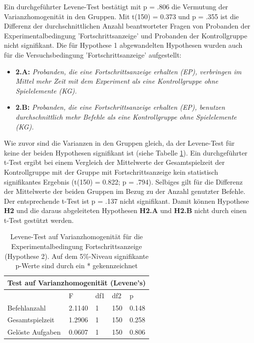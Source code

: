 Ein durchgeführter Levene-Test bestätigt mit p = .806 die Vermutung der Varianzhomogenität in den Gruppen. Mit t(150) = 0.373 und p = .355 ist die Differenz der durchschnittlichen Anzahl beantworteter Fragen von Probanden der Experimentalbedingung 'Fortschrittsanzeige' und Probanden der Kontrollgruppe nicht signifikant. Die für Hypothese 1 abgewandelten Hypothesen wurden auch für die Versuchsbedingung 'Fortschrittsanzeige' aufgestellt: 

\begin{itemize}
    \item \textbf{2.A:} \textit{Probanden, die eine Fortschrittsanzeige erhalten (EP), verbringen im Mittel mehr Zeit mit dem Experiment als eine Kontrollgruppe ohne Spielelemente (KG).}
    \item \textbf{2.B:} \textit{Probanden, die eine Fortschrittsanzeige erhalten (EP), benutzen durchschnittlich mehr Befehle als eine Kontrollgruppe ohne Spielelemente (KG).} 
\end{itemize}

 Wie zuvor sind die Varianzen in den Gruppen gleich, da der Levene-Test für keine der beiden Hypothesen signifikant ist (siehe Tabelle \ref{levene_hypo_2}). Ein durchgeführter t-Test ergibt bei einem Vergleich  der  Mittelwerte  der Gesamtspielzeit der Kontrollgruppe mit der Gruppe mit Fortschrittsanzeige kein statistisch signifikantes Ergebnis (t(150) = 0.822; p = .794). Selbiges gilt für die Differenz der Mittelwerte der beiden Gruppen im Bezug zu der Anzahl genutzter Befehle. Der entsprechende t-Test ist p = .137 nicht signifikant. Damit können Hypothese \textbf{H2} und die daraus abgeleiteten Hypothesen \textbf{H2.A} und \textbf{H2.B} nicht durch einen t-Test gestützt werden.


\begin{table}[htbp]
\centering
\begin{tabular}{ |p{4cm}||p{2.0cm}|p{2.0cm}|p{2.0cm}|p{2.0cm}| }
 \hline
 \multicolumn{5}{|c|}{Test auf Varianzhomogenität (Levene's)} \\
 \hline
 & F & df1 &df2 &p \\
 \hline
  Befehlanzahl      & 2.1140     & 1 &   150 & 0.148\\
  Gesamtspielzeit   & 1.2906     & 1 &   150 & 0.258\\
  Gelöste Aufgaben  & 0.0607     & 1 &   150 & 0.806\\
 \hline
\end{tabular}
\caption{Levene-Test auf Varianzhomogenität für die Experimentalbedingung Fortschrittsanzeige (Hypothese 2). Auf dem 5\%-Niveau signifikante p-Werte sind durch ein * gekennzeichnet}
\label{levene_hypo_2}
\end{table}

